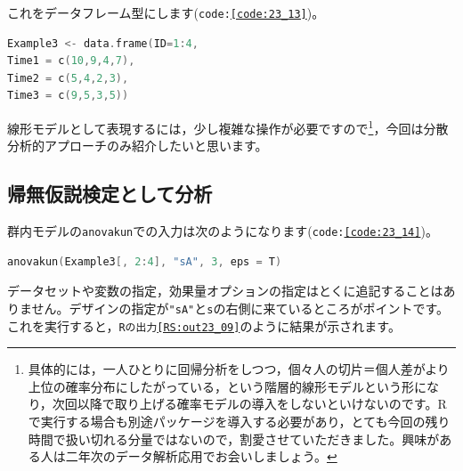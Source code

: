 \documentclass{ltjbook}
\begin{document}
これをデータフレーム型にします(\texttt{code:\ref{code:23_13}})。
\begin{lstlisting}[language=c++,label={code:23_13},caption={データフレームにする}]
Example3 <- data.frame(ID=1:4,
Time1 = c(10,9,4,7),
Time2 = c(5,4,2,3),
Time3 = c(9,5,3,5))
\end{lstlisting}

線形モデルとして表現するには，少し複雑な操作が必要ですので\footnote{具体的には，一人ひとりに回帰分析をしつつ，個々人の切片＝個人差がより上位の確率分布にしたがっている，という階層的線形モデルという形になり，次回以降で取り上げる確率モデルの導入をしないといけないのです。Rで実行する場合も別途パッケージを導入する必要があり，とても今回の残り時間で扱い切れる分量ではないので，割愛させていただきました。興味がある人は二年次のデータ解析応用でお会いしましょう。}，今回は分散分析的アプローチのみ紹介したいと思います。
\subsection{帰無仮説検定として分析}
群内モデルの\texttt{anovakun}での入力は次のようになります(\texttt{code:\ref{code:23_14}})。
\begin{lstlisting}[language=c++,label={code:23_14},caption={anovakunで実行}]
anovakun(Example3[, 2:4], "sA", 3, eps = T)
\end{lstlisting}
データセットや変数の指定，効果量オプションの指定はとくに追記することはありません。デザインの指定が\texttt{"sA"}と\texttt{s}の右側に来ているところがポイントです。これを実行すると，\texttt{Rの出力\ref{RS:out23_09}}のように結果が示されます。
\end{document}
